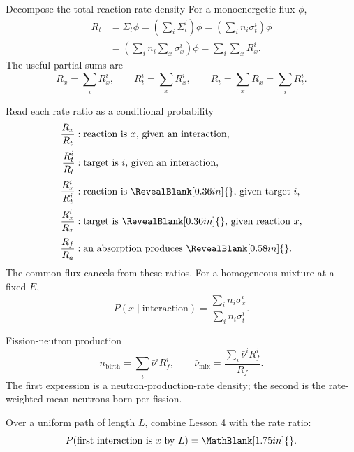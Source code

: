 \newpage
\begin{handoutcolumns}


\begin{fixedbox}{Decompose the total reaction-rate density}
For a monoenergetic flux $\phi$,
\[
\begin{aligned}
 R_t
 &=\Sigma_t\phi
  =\left(\sum_i\Sigma_t^i\right)\phi
  =\left(\sum_i n_i\sigma_t^i\right)\phi \\
 &=\left(\sum_i n_i\sum_x\sigma_x^i\right)\phi
  =\sum_i\sum_x R_x^i.
\end{aligned}
\]
The useful partial sums are
\[
 R_x=\sum_iR_x^i,
 \qquad
 R_t^i=\sum_xR_x^i,
 \qquad
 R_t=\sum_xR_x=\sum_iR_t^i.
\]
\end{fixedbox}

\begin{boardbox}{Read each rate ratio as a conditional probability}
\footnotesize
\begin{align*}
 \frac{R_x}{R_t}
   &: \text{reaction is }x\text{, given an interaction},\\[2pt]
 \frac{R_t^i}{R_t}
   &: \text{target is }i\text{, given an interaction},\\[2pt]
 \frac{R_x^i}{R_t^i}
   &: \text{reaction is }\RevealBlank[0.36in]{}\text{, given target }i,\\[2pt]
 \frac{R_x^i}{R_x}
   &: \text{target is }\RevealBlank[0.36in]{}\text{, given reaction }x,\\[2pt]
 \frac{R_f}{R_a}
   &: \text{an absorption produces }\RevealBlank[0.58in]{}.
\end{align*}
The common flux cancels from these ratios. For a homogeneous mixture at a
fixed $E$,
\[
 \boxed{P(x\mid\text{interaction})
 =\frac{\sum_i n_i\sigma_x^i}{\sum_i n_i\sigma_t^i}}.
\]
\normalsize
\end{boardbox}

\begin{fixedbox}{Fission-neutron production}
\[
 \dot n_{\mathrm{birth}}=\sum_i\bar\nu^iR_f^i,
 \qquad
 \bar\nu_{\mathrm{mix}}
 =\frac{\sum_i\bar\nu^iR_f^i}{R_f}.
\]
The first expression is a neutron-production-rate density; the second is the
rate-weighted mean neutrons born per fission.
\end{fixedbox}

\begin{checkpoint}
Over a uniform path of length $L$, combine Lesson 4 with the rate ratio:
\[
 P(\text{first interaction is }x\text{ by }L)
 =\MathBlank[1.75in]{}.
\]
\end{checkpoint}


\end{handoutcolumns}

